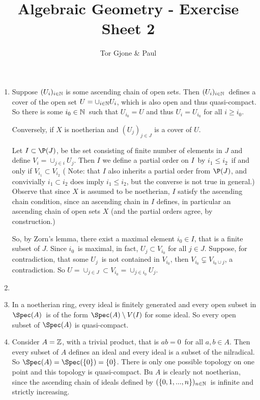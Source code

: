 \documentclass[a4paper,11pt,english]{article}
\title{\textbf{Algebraic Geometry} - Exercise Sheet 2}
\author{Tor Gjone \& Paul}
\begin{document}
\mmaketitle

\begin{exercise}[2]
\begin{enumerate}
\item
Suppose $(U_i)_{i\in \mathbb{N}}$ is some ascending chain of open sets.
Then $(U_i)_{i\in \mathbb{N}}$ defines a cover of the open set $U = \cup_{i\in \mathbb{N}} U_i$,
which is also open and thus quasi-compact. So there is some $i_0 \in \mathbb{N}$ such
that $U_{i_0} = U$ and thus $U_i = U_{i_0}$ for all $i\ge i_0$.

Conversely, if $X$ is noetherian and $(U_j)_{j\in J}$ is a cover of $U$. 

Let $I \subset \P(J)$, be the set consisting of finite number of elements in
$J$ and define $V_i = \cup_{j \in i} U_j$. Then $I$ we define a partial order on
$I$ by $i_1 \le i_2$ if and only if $V_{i_1} \subset V_{i_2}$ 
( Note: that $I$ also inherits a partial order from $\P(J)$, and convivially 
$i_1 \subset i_2$ does imply $i_1 \le i_2$, but the converse is not true in
general.)
Observe that since $X$ is assumed to be noetherian, $I$ satisfy the ascending
chain condition, since an ascending chain in $I$ defines, in particular an
ascending chain of open sets $X$ (and the partial orders agree, by construction.) 

So, by Zorn's lemma, there exist a maximal element $i_0 \in I$, that is a finite
subset of $J$. Since $i_0$ is maximal, in fact, $U_j \subset V_{i_0}$ for all
$j\in J$. Suppose, for contradiction, that some $U_j$ is not contained in
$V_{i_0}$, then $V_{i_0} \subsetneq V_{i_0 \cup {j}}$, a contradiction. So
$U = \cup_{j \in J} \subset V_{i_0} = \cup_{j \in i_0} U_j$.

\item

\item
In a noetherian ring, every ideal is finitely generated and every open subset 
in $\Spec(A)$ is of the form $\Spec(A)\setminus V(I)$ for some ideal. So every 
open subset of $\Spec(A)$ is quasi-compact.

\item
Consider $A = \mathbb{Z}$, with a trivial product, that is $a b = 0$ for all $a,b \in A$.
Then every subset of $A$ defines an ideal and every ideal is a subset of the
nilradical. So $\Spec(A) = \Spec(\{0\}) = \{0\}$. There is only one possible
topology on one point and this topology is quasi-compact. Bu $A$ is clearly not
noetherian, since the ascending chain of ideals defined by
$(\{0,1,...,n\})_{n\in \mathbb{N}}$ is infinite and strictly increasing.
\end{enumerate}
\end{exercise} 
\end{document}
